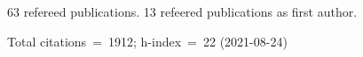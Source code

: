 63 refereed publications. 13 refeered publications as first author.

Total citations~=~1912; h-index~=~22 (2021-08-24)